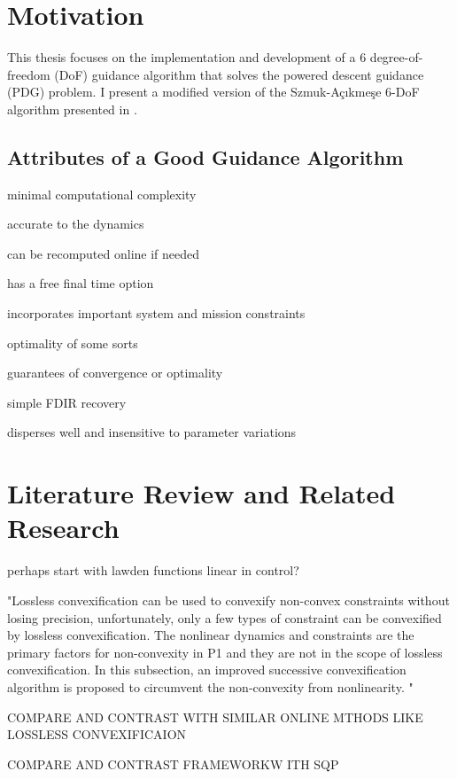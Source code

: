 \section{Motivation}
This thesis focuses on the implementation and development of a 6 degree-of-freedom (DoF) guidance algorithm that solves the powered descent guidance (PDG) problem. I present a modified version of the Szmuk-Açıkmeşe 6-DoF algorithm presented in \cite{szmuk2018successive}.


\subsection{Attributes of a Good Guidance Algorithm}
minimal computational complexity

accurate to the dynamics

can be recomputed online if needed

has a free final time option

incorporates important system and mission constraints

optimality of some sorts

guarantees of convergence or optimality

simple FDIR recovery

disperses well and insensitive to parameter variations





\section{Literature Review and Related Research}
perhaps start with lawden functions linear in control?

"Lossless convexification can be used to convexify non-convex constraints without losing precision,
unfortunately, only a few types of constraint can be convexified by lossless convexification. The nonlinear dynamics
and constraints are the primary factors for non-convexity in P1 and they are not in the scope of lossless
convexification. In this subsection, an improved successive convexification algorithm is proposed to circumvent the
non-convexity from nonlinearity. "

COMPARE AND CONTRAST WITH SIMILAR ONLINE MTHODS LIKE LOSSLESS CONVEXIFICAION

COMPARE AND CONTRAST FRAMEWORKW ITH SQP



